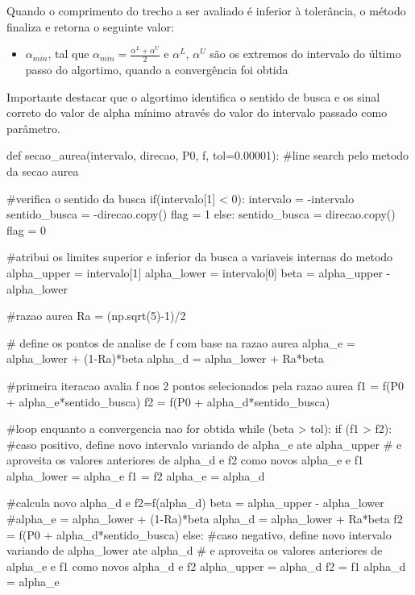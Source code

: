 \documentclass[10pt, a4paper]{article}
\begin{document}
Quando o comprimento do trecho a ser avaliado é inferior à tolerância, o método finaliza e retorna o seguinte valor:

\begin{itemize}
  \item $\alpha_{min}$, tal que $\alpha_{min} = \frac{\alpha^L + \alpha^U}{2}$ e $\alpha^L$, $\alpha^U$ são os extremos do
  intervalo do último passo do algortimo, quando a convergência foi obtida
\end{itemize} 

Importante destacar que o algortimo identifica o sentido de busca e os sinal correto do valor de alpha mínimo através do valor do intervalo passado como parâmetro.


\begin{python}

def secao_aurea(intervalo, direcao, P0, f, tol=0.00001):
    #line search pelo metodo da secao aurea
    
    #verifica o sentido da busca
    if(intervalo[1] < 0):
        intervalo = -intervalo
        sentido_busca = -direcao.copy()
        flag = 1
    else:
        sentido_busca = direcao.copy()
        flag = 0
    
    #atribui os limites superior e inferior da busca a variaveis internas do metodo
    alpha_upper = intervalo[1]
    alpha_lower = intervalo[0]
    beta = alpha_upper - alpha_lower
    
    #razao aurea
    Ra = (np.sqrt(5)-1)/2
    
    # define os pontos de analise de f com base na razao aurea
    alpha_e = alpha_lower + (1-Ra)*beta
    alpha_d = alpha_lower + Ra*beta 
    
    #primeira iteracao avalia f nos 2 pontos selecionados pela razao aurea
    f1 = f(P0 + alpha_e*sentido_busca)
    f2 = f(P0 + alpha_d*sentido_busca)
    
    #loop enquanto a convergencia nao for obtida
    while (beta > tol):
        if (f1 > f2):
            #caso positivo, define novo intervalo variando de alpha_e ate alpha_upper
            # e aproveita os valores anteriores de alpha_d e f2 como novos alpha_e e f1
            alpha_lower = alpha_e
            f1 = f2
            alpha_e = alpha_d
            
            #calcula novo alpha_d e f2=f(alpha_d)
            beta = alpha_upper - alpha_lower
            #alpha_e = alpha_lower + (1-Ra)*beta
            alpha_d = alpha_lower + Ra*beta 
            f2 = f(P0 + alpha_d*sentido_busca)
        else:
            #caso negativo, define novo intervalo variando de alpha_lower ate alpha_d
            # e aproveita os valores anteriores de alpha_e e f1 como novos alpha_d e f2
            alpha_upper = alpha_d
            f2 = f1
            alpha_d = alpha_e
            

\end{python}
\end{document}
